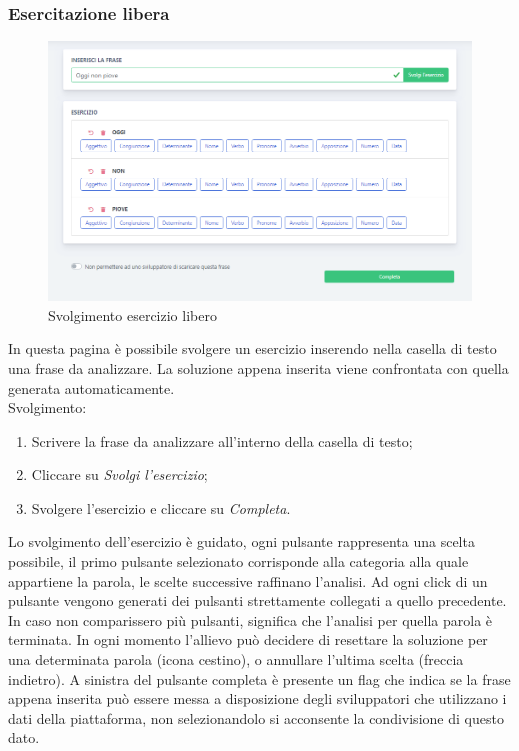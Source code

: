 		 \subsubsection{Esercitazione libera}      
        	\begin{figure}[H]
                \centering
                \includegraphics[width=17cm]{sez/img/studente/esercitazioneLiberaEsegui.PNG} 
                \caption{Svolgimento esercizio libero}\label{fig:1}
        	\end{figure}
          In questa pagina è possibile svolgere un esercizio inserendo nella casella di testo una frase da analizzare. La soluzione appena inserita viene confrontata con quella generata automaticamente.
        \\ Svolgimento:
        	\begin{enumerate}        
            	\item Scrivere la frase da analizzare all'interno della casella di testo;
            	\item Cliccare su \textit{Svolgi l'esercizio};
            	\item Svolgere l'esercizio e cliccare su \textit{Completa}.
        	\end{enumerate}
        	\label{sec:esLib}
        	Lo svolgimento dell'esercizio è guidato, ogni pulsante rappresenta una scelta possibile, il primo pulsante selezionato corrisponde alla categoria alla quale appartiene la parola, le scelte successive raffinano l'analisi. Ad ogni click di un pulsante vengono generati dei pulsanti strettamente collegati a quello precedente. In caso non comparissero più pulsanti, significa che l'analisi per quella parola è terminata. In ogni momento l'allievo può decidere di resettare la soluzione per una determinata parola (icona cestino), o annullare l'ultima scelta (freccia indietro).        \linebreak	
        A sinistra del pulsante completa è presente un {flag} che indica se la frase appena inserita può essere messa a disposizione degli sviluppatori che utilizzano i dati della piattaforma, non selezionandolo si acconsente la condivisione di questo dato.
        	

